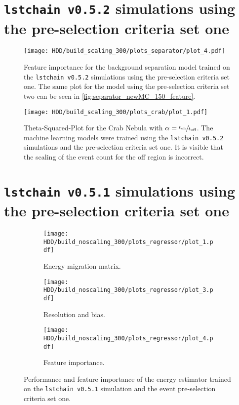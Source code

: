 \section{\texttt{lstchain v0.5.2} simulations using the pre-selection criteria set one}
\begin{figure}
    \centering
    \texttt{[image: HDD/build\_scaling\_300/plots\_separator/plot\_4.pdf]}
    \caption{Feature importance for the background separation model trained on the \texttt{lstchain v0.5.2} simulations using the pre-selection criteria set one.
        The same plot for the model using the pre-selection criteria set two can be seen in \autoref{fig:separator_newMC_150_feature}.
    }
    \label{fig:separator_newMC_300_feature}
\end{figure}
\begin{figure}
    \centering
    \texttt{[image: HDD/build\_scaling\_300/plots\_crab/plot\_1.pdf]}
    \caption{Theta-Squared-Plot for the Crab Nebula with $\alpha = \sfrac{t_\text{on}}{t_\text{off}}$.
        The machine learning models were trained using the \texttt{lstchain v0.5.2} simulations and the pre-selection criteria set one.
        It is visible that the scaling of the event count for the off region is incorrect.
    }
    \label{fig:crab_best_total_time}
\end{figure}


\section{\texttt{lstchain v0.5.1} simulations using the pre-selection criteria set one}

\begin{figure}
    \centering
    \begin{subfigure}{0.49\textwidth}
        \centering
        \texttt{[image: HDD/build\_noscaling\_300/plots\_regressor/plot\_1.pdf]}
        \caption{Energy migration matrix.}
    \end{subfigure}
    \hfill
    \begin{subfigure}{0.49\textwidth}
        \centering
        \texttt{[image: HDD/build\_noscaling\_300/plots\_regressor/plot\_3.pdf]}
        \caption{Resolution and bias.}
    \end{subfigure}
    \newline\vfill
    \begin{subfigure}{0.7\textwidth}
        \centering
        \texttt{[image: HDD/build\_noscaling\_300/plots\_regressor/plot\_4.pdf]}
        \caption{Feature importance.}
    \end{subfigure}
    \caption{Performance and feature importance of the energy estimator trained on the \texttt{lstchain v0.5.1} simulation and the event pre-selection criteria set one.}
    \label{fig:regressor_oldMC_300}
\end{figure}

